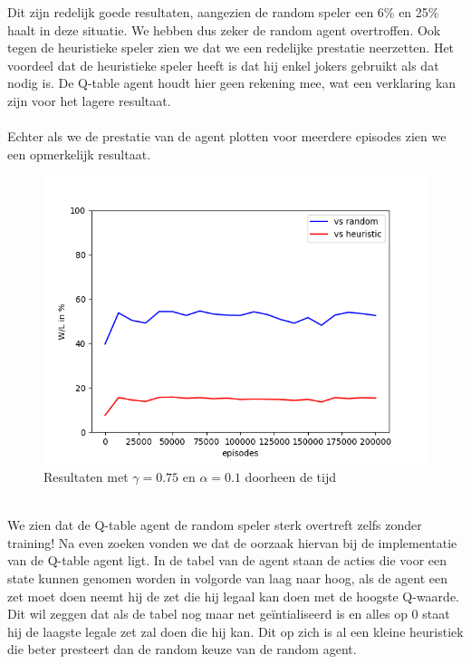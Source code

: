 \documentclass[11pt]{article}
\begin{document}
Dit zijn redelijk goede resultaten, aangezien de random speler een 6\% en 25\% haalt in deze situatie. We hebben dus zeker de random agent overtroffen. Ook tegen de heuristieke speler zien we dat we een redelijke prestatie neerzetten. Het voordeel dat de heuristieke speler heeft is dat hij enkel jokers gebruikt als dat nodig is. De Q-table agent houdt hier geen rekening mee, wat een verklaring kan zijn voor het lagere resultaat.\\\\
\newpage
Echter als we de prestatie van de agent plotten voor meerdere episodes zien we een opmerkelijk resultaat.\\
\begin{figure}[h]
\centering
\includegraphics[scale=0.55]{images/wins_in_time.png}
\caption{Resultaten met $\gamma = 0.75$ en $\alpha = 0.1$ doorheen de tijd}
\end{figure}\\
We zien dat de Q-table agent de random speler sterk overtreft zelfs zonder training! Na even zoeken vonden we dat de oorzaak hiervan bij de implementatie van de Q-table agent ligt. In de tabel van de agent staan de acties die voor een state kunnen genomen worden in volgorde van laag naar hoog, als de agent een zet moet doen neemt hij de zet die hij legaal kan doen met de hoogste Q-waarde. Dit wil zeggen dat als de tabel nog maar net geïntialiseerd is en alles op 0 staat hij de laagste legale zet zal doen die hij kan. Dit op zich is al een kleine heuristiek die beter presteert dan de random keuze van de random agent.\\\\
\end{document}
